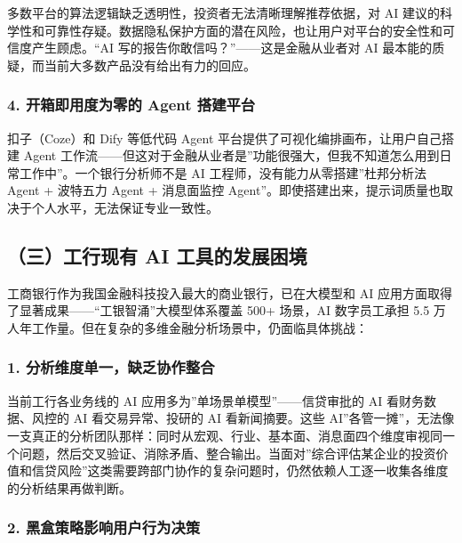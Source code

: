 \documentclass[
]{ctexart}
\begin{document}
多数平台的算法逻辑缺乏透明性，投资者无法清晰理解推荐依据，对 AI
建议的科学性和可靠性存疑。数据隐私保护方面的潜在风险，也让用户对平台的安全性和可信度产生顾虑。``AI
写的报告你敢信吗？''------这是金融从业者对 AI
最本能的质疑，而当前大多数产品没有给出有力的回应。

\subsubsection{4. 开箱即用度为零的 Agent
搭建平台}\label{ux5f00ux7bb1ux5373ux7528ux5ea6ux4e3aux96f6ux7684-agent-ux642dux5efaux5e73ux53f0}

扣子（Coze）和 Dify 等低代码 Agent
平台提供了可视化编排画布，让用户自己搭建 Agent
工作流------但这对于金融从业者是''功能很强大，但我不知道怎么用到日常工作中''。一个银行分析师不是
AI 工程师，没有能力从零搭建''杜邦分析法 Agent + 波特五力 Agent +
消息面监控
Agent''。即使搭建出来，提示词质量也取决于个人水平，无法保证专业一致性。

\subsection{（三）工行现有 AI
工具的发展困境}\label{ux4e09ux5de5ux884cux73b0ux6709-ai-ux5de5ux5177ux7684ux53d1ux5c55ux56f0ux5883}

工商银行作为我国金融科技投入最大的商业银行，已在大模型和 AI
应用方面取得了显著成果------``工银智涌''大模型体系覆盖 500+ 场景，AI
数字员工承担 5.5
万人年工作量。但在复杂的多维金融分析场景中，仍面临具体挑战：

\subsubsection{1.
分析维度单一，缺乏协作整合}\label{ux5206ux6790ux7ef4ux5ea6ux5355ux4e00ux7f3aux4e4fux534fux4f5cux6574ux5408}

当前工行各业务线的 AI 应用多为''单场景单模型''------信贷审批的 AI
看财务数据、风控的 AI 看交易异常、投研的 AI 看新闻摘要。这些
AI''各管一摊''，无法像一支真正的分析团队那样：同时从宏观、行业、基本面、消息面四个维度审视同一个问题，然后交叉验证、消除矛盾、整合输出。当面对''综合评估某企业的投资价值和信贷风险''这类需要跨部门协作的复杂问题时，仍然依赖人工逐一收集各维度的分析结果再做判断。

\subsubsection{2.
黑盒策略影响用户行为决策}\label{ux9ed1ux76d2ux7b56ux7565ux5f71ux54cdux7528ux6237ux884cux4e3aux51b3ux7b56}
\end{document}
